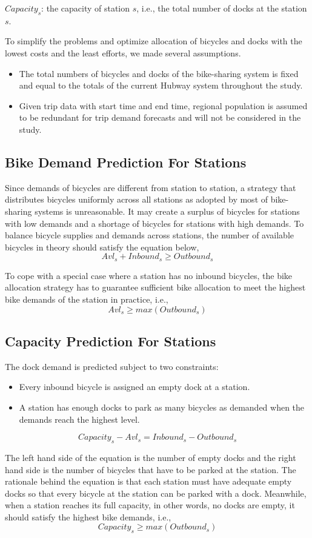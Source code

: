 \documentclass[journal, letterpaper]{IEEEtran}
\begin{document}
$Capacity_{s}$: the capacity of station $s$, i.e., the total number of docks at the station $s$. 

To simplify the problems and optimize allocation of bicycles and docks with the lowest costs and the least efforts, we made several assumptions.

\begin{itemize}
\item The total numbers of bicycles and docks of the bike-sharing system is fixed and equal to the totals of the current Hubway system throughout the study.
\item Given trip data with start time and end time, regional population is assumed to be redundant for trip demand forecasts and will not be considered in the study.
\end{itemize} 
\subsection{Bike Demand Prediction For Stations}
Since demands of bicycles are different from station to station, a strategy that distributes bicycles uniformly across all stations as adopted by most of bike-sharing systems is unreasonable. It may create a surplus of bicycles for stations with low demands and a shortage of bicycles for stations with high demands. To balance bicycle supplies and demands across stations, the number of available bicycles in theory should satisfy the equation below,
$$Avl_{s} + Inbound_{s} \ge Outbound_{s}$$

To cope with a special case where a station has no inbound bicycles, the bike allocation strategy has to guarantee sufficient bike allocation to meet the highest bike demands of the station in practice, i.e.,
$$Avl_{s} \ge max(Outbound_{s})$$
\subsection{Capacity Prediction For Stations}
The dock demand is predicted subject to two constraints:
\begin{itemize}
\item Every inbound bicycle is assigned an empty dock at a station.
\item A station has enough docks to park as many bicycles as demanded when the demands reach the highest level.
\end{itemize}

$$Capacity_{s} - Avl_{s} = Inbound_{s} - Outbound_{s}$$

The left hand side of the equation is the number of empty docks and the right hand side is the number of bicycles that have to be parked at the station. The rationale behind the equation is that each station must have adequate empty docks so that every bicycle at the station can be parked with a dock. Meanwhile, when a station reaches its full capacity, in other words, no docks are empty, it should satisfy the highest bike demands, i.e., 
$$Capacity_{s} \ge max(Outbound_{s})$$
\end{document}
